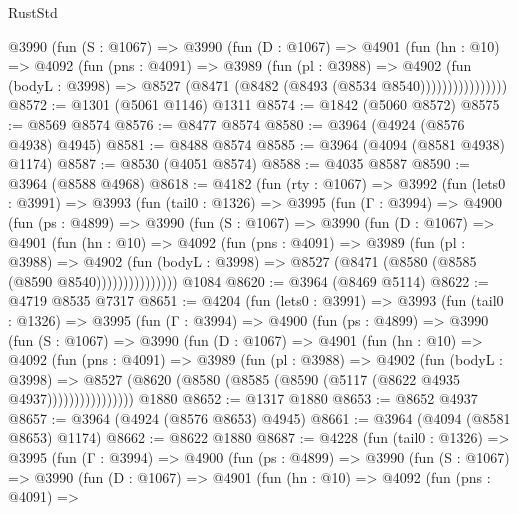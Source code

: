 \begin{lexlean}{RustStd}
\begin{coremodule}
{\begin{coremodule}
{{{{{{{{{{{{{{{{{{{{{{{{{{{{{{{{{{{{{{              @3990
                (fun (S : @1067) =>
                @3990
                  (fun (D : @1067) =>
                  @4901
                    (fun (hn : @10) =>
                    @4092
                      (fun (pns : @4091) =>
                      @3989
                        (fun (pl : @3988) =>
                        @4902
                          (fun (bodyL : @3998) =>
                          @8527 (@8471 (@8482 (@8493 (@8534 @8540))))))))))))))))
@8572 := @1301 (@5061 @1146) @1311
@8574 := @1842 (@5060 @8572)
@8575 := @8569 @8574
@8576 := @8477 @8574
@8580 := @3964 (@4924 (@8576 @4938) @4945)
@8581 := @8488 @8574
@8585 := @3964 (@4094 (@8581 @4938) @1174)
@8587 := @8530 (@4051 @8574)
@8588 := @4035 @8587
@8590 := @3964 (@8588 @4968)
@8618 := @4182
    (fun (rty : @1067) =>
    @3992
      (fun (lets0 : @3991) =>
      @3993
        (fun (tail0 : @1326) =>
        @3995
          (fun (Γ : @3994) =>
          @4900
            (fun (ps : @4899) =>
            @3990
              (fun (S : @1067) =>
              @3990
                (fun (D : @1067) =>
                @4901
                  (fun (hn : @10) =>
                  @4092
                    (fun (pns : @4091) =>
                    @3989
                      (fun (pl : @3988) =>
                      @4902
                        (fun (bodyL : @3998) =>
                        @8527 (@8471 (@8580 (@8585 (@8590 @8540)))))))))))))))
    @1084
@8620 := @3964 (@8469 @5114)
@8622 := @4719 @8535 @7317
@8651 := @4204
    (fun (lets0 : @3991) =>
    @3993
      (fun (tail0 : @1326) =>
      @3995
        (fun (Γ : @3994) =>
        @4900
          (fun (ps : @4899) =>
          @3990
            (fun (S : @1067) =>
            @3990
              (fun (D : @1067) =>
              @4901
                (fun (hn : @10) =>
                @4092
                  (fun (pns : @4091) =>
                  @3989
                    (fun (pl : @3988) =>
                    @4902
                      (fun (bodyL : @3998) =>
                      @8527 (@8620 (@8580 (@8585 (@8590 (@5117 (@8622 @4935 @4937))))))))))))))))
    @1880
@8652 := @1317 @1880
@8653 := @8652 @4937
@8657 := @3964 (@4924 (@8576 @8653) @4945)
@8661 := @3964 (@4094 (@8581 @8653) @1174)
@8662 := @8622 @1880
@8687 := @4228
    (fun (tail0 : @1326) =>
    @3995
      (fun (Γ : @3994) =>
      @4900
        (fun (ps : @4899) =>
        @3990
          (fun (S : @1067) =>
          @3990
            (fun (D : @1067) =>
            @4901
              (fun (hn : @10) =>
              @4092
                (fun (pns : @4091) =>
}}}}}}}}}}}}}}}}}}}}}}}}}}}}}}}}}}}}}}
\end{coremodule}}
\end{coremodule}
\end{lexlean}
